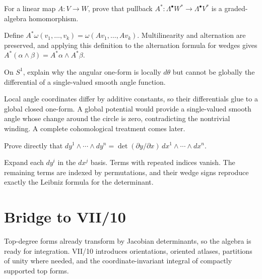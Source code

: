 \begin{problem}\label{prob:vii09-ch03}
For a linear map \(A:V\to W\), prove that pullback \(A^*:\Lambda^\bullet W^*\to\Lambda^\bullet V^*\) is a graded-algebra homomorphism.
\end{problem}
\begin{solution}
Define \(A^*\omega(v_1,\ldots,v_k)=\omega(Av_1,\ldots,Av_k)\). Multilinearity and alternation are preserved, and applying this definition to the alternation formula for wedges gives \(A^*(\alpha\wedge\beta)=A^*\alpha\wedge A^*\beta\).
\end{solution}

\begin{problem}\label{prob:vii09-ch04}
On \(S^1\), explain why the angular one-form is locally \(d\theta\) but cannot be globally the differential of a single-valued smooth angle function.
\end{problem}
\begin{solution}
Local angle coordinates differ by additive constants, so their differentials glue to a global closed one-form. A global potential would provide a single-valued smooth angle whose change around the circle is zero, contradicting the nontrivial winding. A complete cohomological treatment comes later.
\end{solution}

\begin{problem}\label{prob:vii09-ch05}
Prove directly that \(dy^1\wedge\cdots\wedge dy^n=\det(\partial y/\partial x)\,dx^1\wedge\cdots\wedge dx^n\).
\end{problem}
\begin{solution}
Expand each \(dy^i\) in the \(dx^j\) basis. Terms with repeated indices vanish. The remaining terms are indexed by permutations, and their wedge signs reproduce exactly the Leibniz formula for the determinant.
\end{solution}

\section*{Bridge to VII/10}
Top-degree forms already transform by Jacobian determinants, so the algebra is ready for integration. VII/10 introduces orientations, oriented atlases, partitions of unity where needed, and the coordinate-invariant integral of compactly supported top forms.
